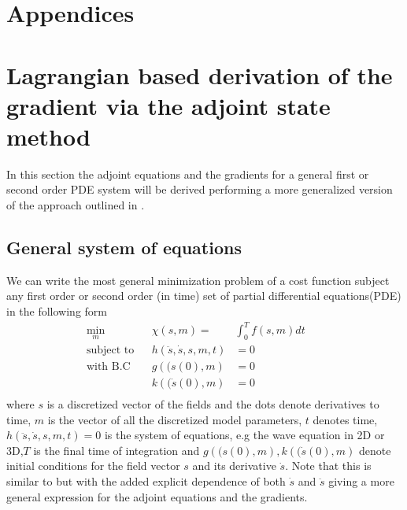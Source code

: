 \documentclass[10pt]{SelfArx} %
\theoremstyle{definition}
\begin{document}


\appendix
\section*{Appendices}
\section{Lagrangian based derivation of the gradient via the adjoint state method}\label{sec:general_math}
In this section the adjoint equations and the gradients for a general first or second order PDE system will be derived performing a more generalized version of the approach outlined in \cite{Bradley2012}.
\subsection{General system of equations}
\label{sec:general_system}
We can write the most general minimization problem of a cost function subject any first order or second order (in time) set of partial differential equations(PDE) in the following form
\begin{equation}
\label{eq:general_system}
\begin{aligned}
\underset{m}{\text{min}} &&  \chi\left(s,m\right) = &  \int_0^T f\left(s,m\right) dt & &\\
\text{subject to} & & h\left(\ddot{s}, \dot{s}, s, m, t\right) & =  0 \\
 \text{with B.C} & & g\left((s\left(0\right), m\right) & = 0 \\
 & & k\left((\dot{s}\left(0\right), m\right) & = 0 \\
\end{aligned}
\end{equation}
where $s$ is a discretized vector of the fields and the dots denote derivatives to time, $m$ is the vector of all the discretized model parameters, $t$ denotes time, $h\left(\ddot{s}, \dot{s}, s, m, t\right)  =  0$ is the system of equations, e.g the wave equation in 2D or 3D,$T$ is the final time of integration and $g\left((s\left(0\right), m\right), k\left((\dot{s}\left(0\right), m\right)$ denote initial conditions for the field vector $s$ and its derivative $\dot{s}$. Note that this is similar to \cite{Bradley2012} but with the added explicit dependence of both $\dot s$ and $\ddot s$ giving a more general expression for the adjoint equations and the gradients. 
\end{document}
